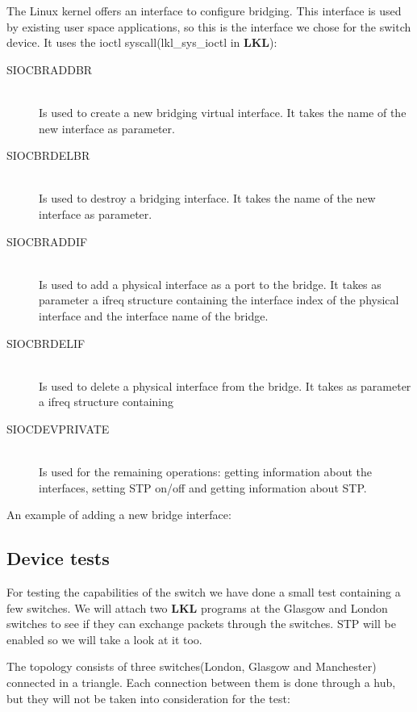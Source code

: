 The Linux kernel offers an interface to configure bridging. This interface is used
by existing user space applications, so this is the interface we chose for the switch device. 
It uses the ioctl syscall(lkl_sys_ioctl in \textbf{LKL}):
\begin{description}
  \item[SIOCBRADDBR] \hfill \\
  Is used to create a new bridging virtual interface. It takes the name of the new interface as parameter.
  \item[SIOCBRDELBR] \hfill \\
  Is used to destroy a bridging interface. It takes the name of the new interface as parameter.
  \item[SIOCBRADDIF] \hfill \\
  Is used to add a physical interface as a port to the bridge. It takes as parameter a ifreq structure containing
the interface index of the physical interface and the interface name of the bridge.
  \item[SIOCBRDELIF] \hfill \\
  Is used to delete a physical interface from the bridge. It takes as parameter a ifreq structure containing
  \item[SIOCDEVPRIVATE] \hfill \\
  Is used for the remaining operations: getting information about the interfaces, setting STP on/off and getting information
about STP.
\end{description}
An example of adding a new bridge interface:

\lstset{language=C,caption=Add bridge function,label=lst:cbridgeadd}


\subsection{Device tests}
\label{sub-sec:switch-tests}

For testing the capabilities of the switch we have done a small test containing a few switches. We will attach two \textbf{LKL} programs at the Glasgow and London switches to see if they can exchange packets through the switches. STP will be enabled so we will take a look at it too.

The topology consists of three switches(London, Glasgow and Manchester) connected in a triangle. Each connection between them is done through a hub, but they will not be taken into consideration for the test:

